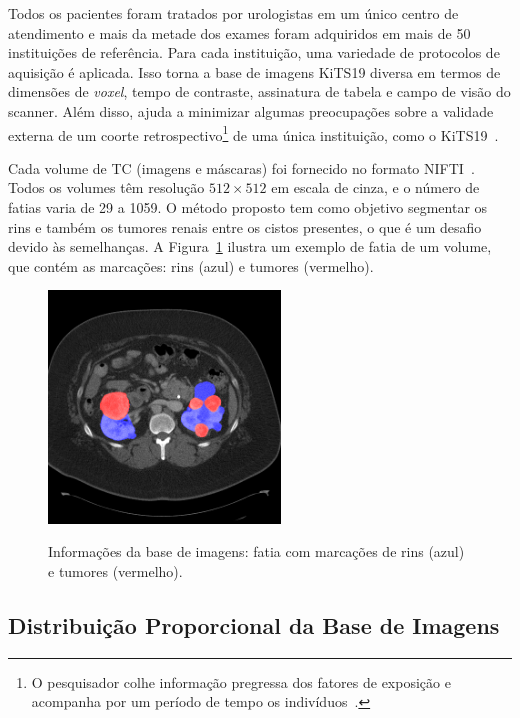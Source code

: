 Todos os pacientes foram tratados por urologistas em um único centro de atendimento e mais da metade dos exames foram adquiridos em mais de 50 instituições de referência. Para cada instituição, uma variedade de protocolos de aquisição é aplicada. Isso torna a base de imagens KiTS19 diversa em termos de dimensões de \textit{voxel}, tempo de contraste, assinatura de tabela e campo de visão do scanner. Além disso, ajuda a minimizar algumas preocupações sobre a validade externa de um coorte retrospectivo\footnote{O pesquisador colhe informação pregressa dos fatores de exposição e acompanha por um período de tempo os indivíduos~\cite{CAMARGO2019}.} de uma única instituição, como o KiTS19~\cite{HELLER2021101821}.

Cada volume de TC (imagens e máscaras) foi fornecido no formato NIFTI~\cite{NIFTI}. Todos os volumes têm resolução $512\times512$ em escala de cinza, e o número de fatias varia de 29 a 1059. O método proposto tem como objetivo segmentar os rins e também os tumores renais entre os cistos presentes, o que é um desafio devido às semelhanças. A Figura~\ref{fig:ExImagemEMascara} ilustra um exemplo de fatia de um volume, que contém as marcações: rins (azul) e tumores (vermelho).

\begin{figure}[ht!]
    \centering
    \caption{Informações da base de imagens: fatia com marcações de rins (azul) e tumores (vermelho).}
    \includegraphics[width=0.55\textwidth]{figuras/exemplo-dataset.png}
    \label{fig:ExImagemEMascara}
\end{figure}

\subsection{Distribuição Proporcional da Base de Imagens}
\label{sec:res-distribuicao-proporcional-dataset}

